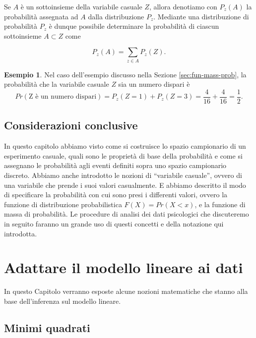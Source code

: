 \documentclass[
  11pt,
]{krantz}
\theoremstyle{definition}
\theoremstyle{definition}
\newtheorem{example}{Esempio}[chapter]
\theoremstyle{definition}
\theoremstyle{definition}
\theoremstyle{remark}
\begin{document}
Se \(A\) è un sottoinsieme della variabile casuale \(Z\), allora denotiamo con \(P_{z}(A)\) la probabilità assegnata ad \(A\) dalla distribuzione \(P_{z}\). Mediante una distribuzione di probabilità \(P_{z}\) è dunque possibile determinare la probabilità di ciascun sottoinsieme \(A \subset Z\) come

\[
P_{z}(A) = \sum_{z \in A} P_{z}(Z).
\]

\begin{example}
Nel caso dell'esempio discusso nella Sezione \ref{sec:fun-mass-prob}, la probabilità che la variabile casuale \(Z\) sia un numero dispari è \[
Pr(\text{Z è un numero dispari}) = P_{z}(Z = 1) + P_{z}(Z = 3) = \frac{4}{16} + \frac{4}{16} = \frac{1}{2}.
\]
\end{example}

\hypertarget{considerazioni-conclusive}{%
\section*{Considerazioni conclusive}\label{considerazioni-conclusive}}


In questo capitolo abbiamo visto come si costruisce lo spazio campionario di un esperimento casuale, quali sono le proprietà di base della probabilità e come si assegnano le probabilità agli eventi definiti sopra uno spazio campionario discreto. Abbiamo anche introdotto le nozioni di ``variabile casuale'', ovvero di una variabile che prende i suoi valori casualmente. E abbiamo descritto il modo di specificare la probabilità con cui sono presi i differenti valori, ovvero la funzione di distribuzione probabilistica \(F(X) = Pr(X < x)\), e la funzione di massa di probabilità. Le procedure di analisi dei dati psicologici che discuteremo in seguito faranno un grande uso di questi concetti e della notazione qui introdotta.

\hypertarget{regr-ml}{%
\chapter{Adattare il modello lineare ai dati}\label{regr-ml}}

In questo Capitolo verranno esposte alcune nozioni matematiche che stanno alla base dell'inferenza sul modello lineare.

\hypertarget{minimi-quadrati}{%
\section{Minimi quadrati}\label{minimi-quadrati}}
\end{document}

